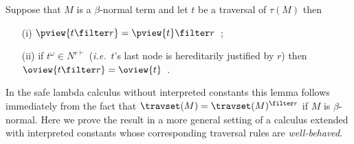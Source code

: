\begin{lemma}
\label{lem:redtrav_trav} Suppose that $M$ is a $\beta$-normal term and let $t$ be a traversal of $\tau(M)$ then
\begin{itemize}
\item[(i)] $ \pview{t \filter  r } = \pview{t} \filter r$\ ;
\item[(ii)] if $t^\omega \in N^{r\vdash}$ ({\it i.e.}~$t$'s last node is hereditarily justified by $r$) then
    $\oview{t \filter r } = \oview{t}$\ .
\end{itemize}
\end{lemma}
In the safe lambda calculus without interpreted constants this lemma
follows immediately from the fact that $\travset(M) =
\travset(M)^{\filter r }$ if $M$ is $\beta$-normal. Here we prove the result in a
more general setting of a calculus extended with interpreted
constants whose corresponding traversal rules are
\emph{well-behaved}.


